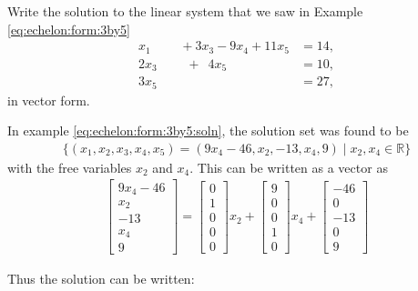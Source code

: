  
 \begin{example} \label{ex:large:linear:solution}
 Write the solution to the linear system that we saw in Example \ref{eq:echelon:form:3by5}
\begin{align*}
x_1\phantom{+2x_3} + 3x_3 -9 x_4 + 11 x_5 & = 14, \\
2x_3 \phantom{-9x_4} +\phantom{1} 4x_5 & = 10, \\
3x_5 & = 27, 
\end{align*}
in vector form.  

\solution

In example \ref{eq:echelon:form:3by5:soln}, the solution set was found to be
%
\begin{align*}
\{ (x_1,x_2,x_3,x_4,x_5) = (9x_4-46,x_2,-13,x_4,9) \; | \; x_2, x_4 \in \mathbb{R}\} 
\end{align*}
with the free variables $x_2$ and $x_4$.  This can be written as a vector as
%
\begin{align*}
\begin{bmatrix}
9x_4 - 46 \\
x_2 \\ 
-13 \\
x_4 \\
9 
\end{bmatrix} = 
\begin{bmatrix}
0 \\ 1 \\ 0 \\ 0 \\0
\end{bmatrix} x_2 + 
\begin{bmatrix}
9 \\ 0 \\ 0 \\ 1 \\ 0
\end{bmatrix} x_4 + 
\begin{bmatrix}
-46 \\ 0 \\ -13 \\ 0 \\ 9 
\end{bmatrix}
\end{align*}

Thus the solution can be written: 


\end{example}
